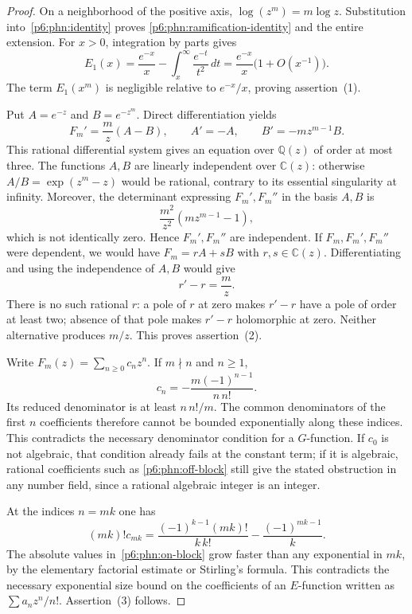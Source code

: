 \documentclass[11pt,a4paper]{article}
\theoremstyle{definition}
\theoremstyle{remark}
\numberwithin{equation}{section}
\begin{document}
\begin{proof}
On a neighborhood of the positive axis, $\log(z^m)=m\log z$.
Substitution into~\eqref{p6:phn:identity} proves
\eqref{p6:phn:ramification-identity} and the entire extension.
For $x>0$, integration by parts gives
\[
 E_1(x)=\frac{e^{-x}}x-
              \int_x^\infty\frac{e^{-t}}{t^2}\,dt
       =\frac{e^{-x}}x\bigl(1+O(x^{-1})\bigr).
\]
The term $E_1(x^m)$ is negligible relative to $e^{-x}/x$, proving
assertion~(1).

Put $A=e^{-z}$ and $B=e^{-z^m}$.  Direct differentiation yields
\begin{equation}\label{p6:phn:system}
 F_m'=\frac m z(A-B),\qquad A'=-A,\qquad
 B'=-mz^{m-1}B.
\end{equation}
This rational differential system gives an equation over
$\mathbb Q(z)$ of order at most three.  The functions $A,B$ are
linearly independent over $\mathbb C(z)$: otherwise
$A/B=\exp(z^m-z)$ would be rational, contrary to its essential
singularity at infinity.  Moreover, the determinant expressing
$F_m',F_m''$ in the basis $A,B$ is
\[
 \frac{m^2}{z^2}(mz^{m-1}-1),
\]
which is not identically zero.  Hence $F_m',F_m''$ are independent.
If $F_m,F_m',F_m''$ were dependent, we would have
$F_m=rA+sB$ with $r,s\in\mathbb C(z)$.  Differentiating and using the
independence of $A,B$ would give
\[
 r'-r=\frac m z.
\]
There is no such rational $r$: a pole of $r$ at zero makes $r'-r$
have a pole of order at least two; absence of that pole makes
$r'-r$ holomorphic at zero.  Neither alternative produces $m/z$.
This proves assertion~(2).

Write $F_m(z)=\sum_{n\geq0}c_nz^n$.  If $m\nmid n$ and $n\geq1$,
\begin{equation}\label{p6:phn:off-block}
 c_n=-\frac{m(-1)^{n-1}}{n\,n!}.
\end{equation}
Its reduced denominator is at least $n\,n!/m$.  The common
denominators of the first $n$ coefficients therefore cannot be
bounded exponentially along these indices.  This contradicts the
necessary denominator condition for a $G$-function.  If $c_0$ is
not algebraic, that condition already fails at the constant term;
if it is algebraic, rational coefficients such as
\eqref{p6:phn:off-block} still give the stated obstruction in any
number field, since a rational algebraic integer is an integer.

At the indices $n=mk$ one has
\begin{equation}\label{p6:phn:on-block}
 (mk)!c_{mk}=\frac{(-1)^{k-1}(mk)!}{k\,k!}
                  -\frac{(-1)^{mk-1}}k.
\end{equation}
The absolute values in~\eqref{p6:phn:on-block} grow faster than any
exponential in $mk$, by the elementary factorial estimate or
Stirling's formula.  This contradicts the necessary exponential
size bound on the coefficients of an $E$-function written as
$\sum a_nz^n/n!$.  Assertion~(3) follows.
\end{proof}
\end{document}
